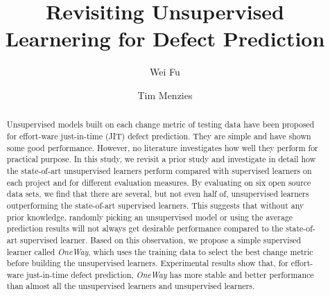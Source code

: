 \documentclass[sigconf,review, anonymous]{acmart}
\theoremstyle{break}
\begin{document}
\title{Revisiting Unsupervised Learnering for Defect Prediction}


\author{Wei Fu}

\author{Tim Menzies}



\begin{abstract}
Unsupervised models built on each change metric of testing data
have been proposed for effort-ware just-in-time (JIT)
defect prediction. They are simple and have shown some good performance.
However, no literature investigates how well they perform for
practical purpose. In this study, we revisit a prior study and investigate in detail how the state-of-art unsupervised learners
perform compared with supervised learners on each project and for different evaluation measures.
By evaluating  on six open source data sets, we find that
there are several, but not even half of, unsupervised learners
outperforming the state-of-art supervised learners.
This suggests that without any prior knowledge, randomly picking
an unsupervised model or using the average prediction results
will not always get desirable performance compared to the state-of-art supervised learner.
Based on this observation, we propose a simple supervised learner called
{\it OneWay}, which uses the training data to select the best change metric before
building the unsupervised learners. Experimental results show that, for effort-ware just-in-time defect prediction, {\it OneWay}
has more stable and  better performance than almost all the unsupervised 
learners and unsupervised learners.



\end{abstract}
\end{document}
